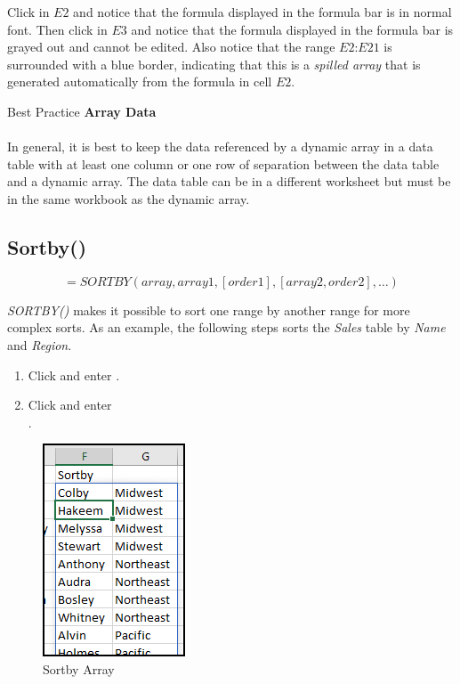 Click in $ E2 $ and notice that the formula displayed in the formula bar is in normal font. Then click in $ E3 $ and notice that the formula displayed in the formula bar is grayed out and cannot be edited. Also notice that the range $ E2 $:$ E21 $ is surrounded with a blue border, indicating that this is a \textit{spilled array} that is generated automatically from the formula in cell $ E2 $.

\begin{center}
	\begin{infobox}{Best Practice}
		\textbf{Array Data}
		\\
		\\
		In general, it is best to keep the data referenced by a dynamic array in a data table with at least one column or one row of separation between the data table and a dynamic array. The data table can be in a different worksheet but must be in the same workbook as the dynamic array.
	\end{infobox}
\end{center}

\subsection{Sortby()}

\[ =SORTBY(array, array1, [order1], [array2, order2],…)  \]

\textit{SORTBY()} makes it possible to sort one range by another range for more complex sorts. As an example, the following steps sorts the \textit{Sales} table by \textit{Name} and \textit{Region}. 

\begin{enumbox}
	\begin{enumerate}
		\item Click  and enter .
		\item Click  and enter\\ . 
	\end{enumerate}
\end{enumbox}

\begin{figure}[H]
	\centering
	\includegraphics{gfx/apb_fig02}
	\caption{Sortby Array}
	\label{apb:fig02}
\end{figure}

